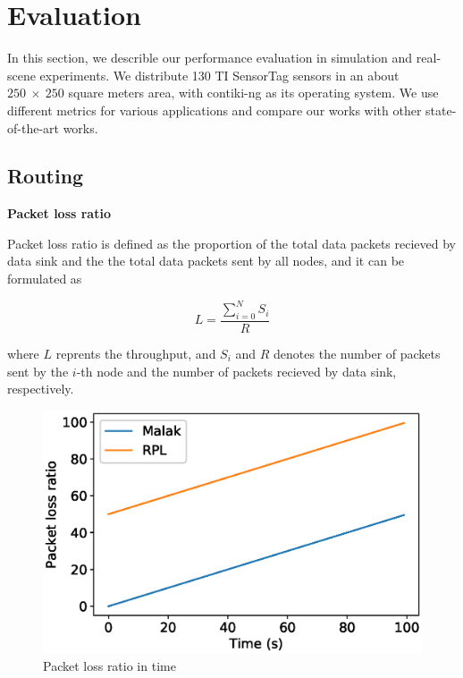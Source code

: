 \section{Evaluation}
\label{Eva}

In this section, we describle our performance evaluation in simulation and
real-scene experiments. We distribute 130 TI SensorTag sensors in an about
$250~\times~250$ square meters area, with contiki-ng as its operating system. We
use different metrics for various applications and compare our works with other
state-of-the-art works.

\subsection{Routing}

\textbf{Packet loss ratio}

Packet loss ratio is defined as the proportion of the total data packets
recieved by data sink and the the total data packets sent by all nodes, and it
can be formulated as

\begin{equation}
	L = \frac{\sum_{i = 0}^{N}S_i}{R}
\end{equation}

where $L$ reprents the throughput, and $S_i$ and $R$ denotes the number of
packets sent by the $i$-th node and the number of packets recieved by data
sink, respectively.

\begin{figure}[htbp]
	\centering
	\includegraphics[width=.85\columnwidth]{Figure/packet_loss_ratio}
	\vspace{-0.1in}
	\caption{Packet loss ratio in time
		\textnormal{
		}}
	\label{fig:packet_loss_ratio}
\end{figure}

